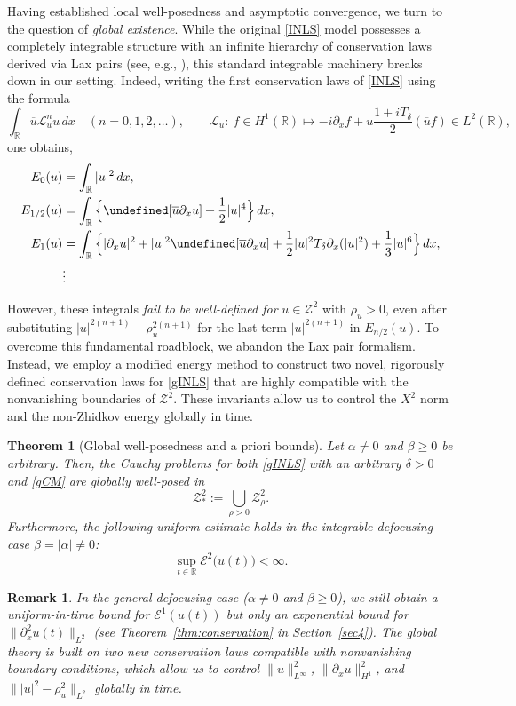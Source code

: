 \documentclass{amsart}
\newtheorem{theorem}{Theorem}[section]
\newtheorem{remark}{Remark}[section]
\numberwithin{equation}{section}
\newcommand{\R}{\mathbb{R}}
\newcommand{\Td}{T_{\delta}}
\let\Im=\undefined\DeclareMathOperator{\Im}{Im}
\begin{document}
\medskip
Having established local well-posedness and asymptotic convergence, we turn to the question of \emph{global existence}. 
While the original \eqref{INLS} model possesses a completely integrable structure with an infinite hierarchy of conservation laws derived via Lax pairs (see, e.g., \cite{PG,CFL}), this standard integrable machinery breaks down in our setting. 
Indeed, writing the first conservation laws of \eqref{INLS} using the formula
\begin{equation}\label{def:lax}
\int _{\mathbb{R}} \overline{u}\mathcal{L}_u^nu\,dx\quad (n=0,1,2,\dots),\qquad \mathcal{L}_u:\ f\in H^1(\R)\mapsto -i\partial_xf+u\frac{1+i\Td}{2}(\overline{u}f)\in L^2(\R),
\end{equation}
one obtains,
\begin{align*}
E_0(u)&=\int_{\mathbb{R}} |u|^2\,dx ,\\
E_{1/2}(u)&=\int_{\mathbb{R}} \Big\{ \Im [\overline{u}\partial_xu]+\frac12|u|^4\Big\} \,dx ,\\
E_1(u)&=\int_{\mathbb{R}} \Big\{ |\partial_xu|^2+|u|^2\Im[\overline{u}\partial_xu]+\frac12|u|^2\Td\partial_x(|u|^2)+\frac13|u|^6\Big\} \,dx ,\\
&\vdots
\end{align*}

However, these integrals \emph{fail to be well-defined for} $u\in \mathcal{Z}^2$ with $\rho_u>0$, even after substituting $|u|^{2(n+1)}-\rho_u^{2(n+1)}$ for the last term $|u|^{2(n+1)}$ in $E_{n/2}(u)$. 
To overcome this fundamental roadblock, we abandon the Lax pair formalism. 
Instead, we employ a modified energy method to construct two novel, rigorously defined conservation laws for \eqref{gINLS} that are highly compatible with the nonvanishing boundaries of $\mathcal{Z}^2$. 
These invariants allow us to control the $X^2$ norm and the non-Zhidkov energy globally in time.

\begin{theorem}[Global well-posedness and a priori bounds]\label{thm:GWP}
Let $\alpha\neq 0$ and $\beta \geq 0$ be arbitrary.  
Then, the Cauchy problems for both \eqref{gINLS} with an arbitrary $\delta>0$ and \eqref{gCM} are globally well-posed in 
\[ \mathcal{Z}^2_*:=\bigcup_{\rho>0}\mathcal{Z}^2_\rho .\]
Furthermore, the following uniform estimate holds in the integrable-defocusing case $\beta=|\alpha|\neq 0$: 
\[ \sup_{t \in \mathbb{R}} \mathcal{E}^2\big( u(t)\big) <\infty. \]
\end{theorem}

\begin{remark}
In the general defocusing case ($\alpha\neq 0$ and $\beta \geq 0$), we still obtain a uniform-in-time bound for $\mathcal{E}^1(u(t))$ but only an exponential bound for $\| \partial_x^2u(t)\|_{L^2}$ (see Theorem~\ref{thm:conservation} in Section~\ref{sec4}). 
The global theory is built on two new conservation laws compatible with nonvanishing boundary conditions, which allow us to control $\|u \|_{L^{\infty}}^2$, $\| \partial_xu \|_{H^1}^2$, and $\| |u|^2-\rho_u^2\|_{L^2}$ globally in time.
\end{remark}
\end{document}
